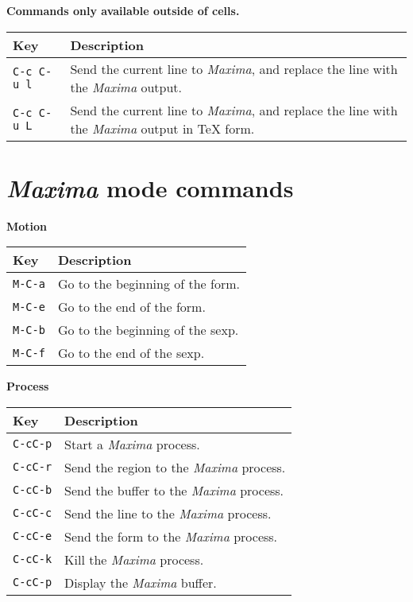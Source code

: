 \documentclass{article}
\newcommand{\mx}{\textsl{\sffamily Maxima}}
\begin{document}
\smallskip

\noindent
\textbf{Commands only available outside of cells.}

\smallskip

\noindent
\begin{tabular}{p{\firstcol}p{\secondcol}}
\hline
\textbf{Key} & \textbf{Description}\\
\hline
\texttt{C-c C-u l}
& Send the current line to \mx{}, and replace the line with the
\mx{} output.\\
\texttt{C-c C-u L}
& Send the current line to \mx{}, and replace the line with the
\mx{} output in \TeX{} form.
\end{tabular}

\newpage

\section{\mx{} mode commands}


\smallskip

\noindent
\textbf{Motion}

\smallskip

\noindent
\begin{tabular}{p{\firstcol}p{\secondcol}}
\hline
\textbf{Key} & \textbf{Description}\\
\hline
\texttt{M-C-a} & Go to the beginning of the form.\\
\texttt{M-C-e} & Go to the end of the form.\\
\texttt{M-C-b} & Go to the beginning of the sexp.\\
\texttt{M-C-f} & Go to the end of the sexp.
\end{tabular}

\smallskip

\noindent
\textbf{Process}

\smallskip

\noindent
\begin{tabular}{p{\firstcol}p{\secondcol}}
\hline
\textbf{Key} & \textbf{Description}\\
\hline
\texttt{C-cC-p} & Start a \mx{} process.\\
\texttt{C-cC-r} & Send the region to the \mx{} process.\\
\texttt{C-cC-b} & Send the buffer to the \mx{} process.\\
\texttt{C-cC-c} & Send the line to the \mx{} process.\\
\texttt{C-cC-e} & Send the form to the \mx{} process.\\
\texttt{C-cC-k} & Kill the \mx{} process.\\
\texttt{C-cC-p} & Display the \mx{} buffer.
\end{tabular}
\end{document}
